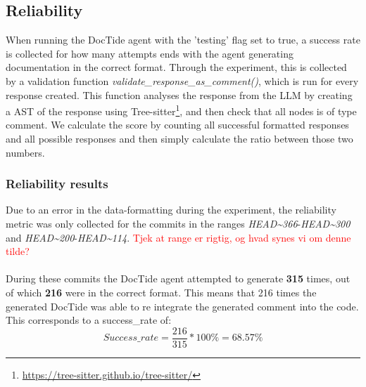 \subsection{Reliability}
When running the DocTide agent with the 'testing' flag set to true, a success rate is collected for how many attempts ends with the agent generating documentation in the correct format.
Through the experiment, this is collected by a validation function \textit{validate\_response\_as\_comment()}, which is run for every response created. This function analyses the response from the LLM by creating a AST of the response using Tree-sitter\footnote{\url{https://tree-sitter.github.io/tree-sitter/}}, and then check that all nodes is of type comment.
We calculate the score by counting all successful formatted responses and all possible responses and then simply calculate the ratio between those two numbers.
\subsubsection{Reliability results}
\label{sec:suc_results}

Due to an error in the data-formatting during the experiment, the reliability metric was only collected for the commits in the ranges \textit{HEAD\textasciitilde366}-\textit{HEAD\textasciitilde300} and  \textit{HEAD\textasciitilde200}-\textit{HEAD\textasciitilde114}. \textcolor{red}{Tjek at range er rigtig, og hvad synes vi om denne tilde?}
\\ \\
During these commits the DocTide agent attempted to generate \textbf{315} times, out of which \textbf{216} were in the correct format. This means that 216 times the generated DocTide was able to re integrate the generated comment into the code. This corresponds to a success\_rate of:
\[
Success\_rate=\frac{216}{315}*100\% = 68.57\%
\]

